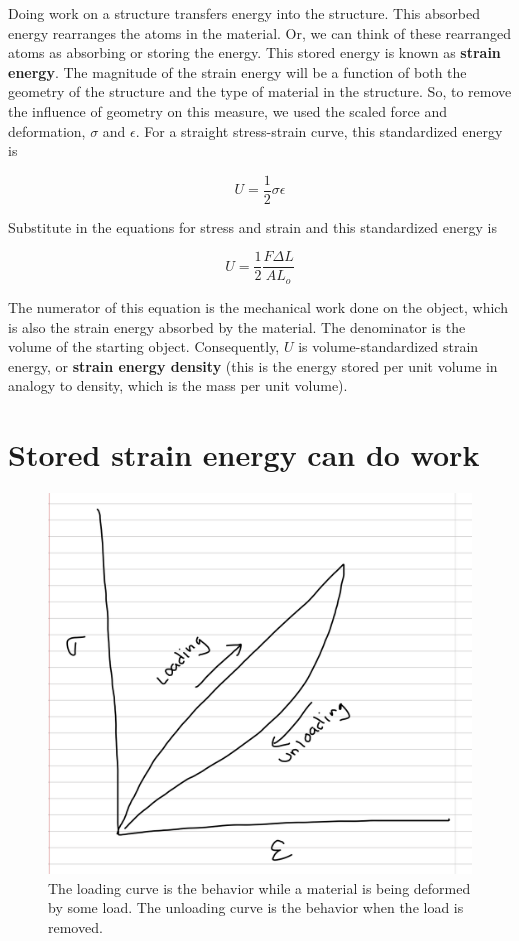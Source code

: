 \documentclass[]{book}
\begin{document}
Doing work on a structure transfers energy into the structure. This
absorbed energy rearranges the atoms in the material. Or, we can think
of these rearranged atoms as absorbing or storing the energy. This
stored energy is known as \textbf{strain energy}. The magnitude of the
strain energy will be a function of both the geometry of the structure
and the type of material in the structure. So, to remove the influence
of geometry on this measure, we used the scaled force and deformation,
\(\sigma\) and \(\epsilon\). For a straight stress-strain curve, this
standardized energy is

\[U = \frac{1}{2} \sigma \epsilon\]

Substitute in the equations for stress and strain and this standardized
energy is

\[U=\frac{1}{2} \frac{F \Delta L}{A L_o}\]

The numerator of this equation is the mechanical work done on the
object, which is also the strain energy absorbed by the material. The
denominator is the volume of the starting object. Consequently, \(U\) is
volume-standardized strain energy, or \textbf{strain energy density}
(this is the energy stored per unit volume in analogy to density, which
is the mass per unit volume).

\section{Stored strain energy can do
work}\label{stored-strain-energy-can-do-work}

\begin{figure}
\centering
\includegraphics{images/materials_chapter/elastic_energy_storage_1.png}
\caption{\label{fig:unnamed-chunk-11}The loading curve is the behavior while
a material is being deformed by some load. The unloading curve is the
behavior when the load is removed.}
\end{figure}
\end{document}
